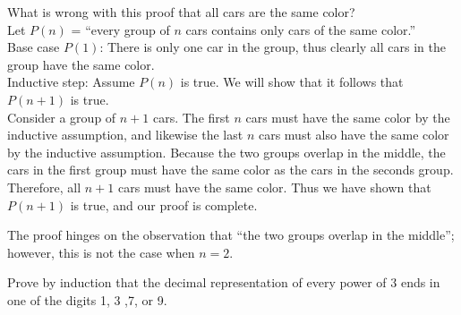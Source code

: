 \documentclass[solution, letterpaper]{cs20inclass}
\begin{document}
\problem

What is wrong with this proof that all cars are the same color?\\

Let $P(n)$ = ``every group of $n$ cars contains only cars of the same color.''\\
Base case $P(1)$: There is only one car in the group, thus clearly all cars in the group have the same color. \\
Inductive step: Assume $P(n)$ is true. We will show that it follows that $P(n+1)$ is true. \\  
Consider a group of $n+1$ cars. The first $n$ cars must have the same color by the inductive assumption, and likewise the last $n$ cars must also have the same color by the inductive assumption. Because the two groups overlap in the middle, the cars in the first group must have the same color as the cars in the seconds group. Therefore, all $n+1$ cars must have the same color. Thus we have shown that $P(n+1)$ is true, and our proof is complete.

\begin{solution}

The proof hinges on the observation that ``the two groups overlap in the middle''; however, this is not the case when $n = 2$.
  
\end{solution}

\problem

Prove by induction that the decimal representation of every power of $3$ ends in one of the digits 1, 3 ,7, or 9.
\end{document}
